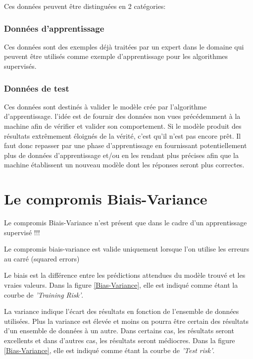 \documentclass[a4paper]{article}
\begin{document}
Ces données peuvent être distinguées en 2 catégories:

\subsubsection{Données d'apprentissage}
Ces données sont des exemples déjà traitées par un expert dans le domaine qui peuvent être utilisés comme exemple d'apprentissage pour les algorithmes supervisés.

\subsubsection{Données de test}
Ces données sont destinés à valider le modèle crée par l'algorithme d'apprentissage. l'idée est de fournir des données non vues précédemment à la machine afin de vérifier et valider son comportement. Si le modèle produit des résultats extrêmement éloignés de la vérité, c'est qu'il n'est pas encore prêt. Il faut donc repasser par une phase d'apprentissage en fournissant potentiellement plus de données d'apprentissage et/ou en les rendant plus précises afin que la machine établissent un nouveau modèle dont les réponses seront plus correctes.

\newpage

\section{Le compromis Biais-Variance}
\label{B-V}
Le compromis Biais-Variance n'est présent que dans le cadre d'un apprentissage supervisé !!!

Le compromis biais-variance est valide uniquement lorsque l'on utilise les erreurs au carré (squared errors)

Le biais est la différence entre les prédictions attendues du modèle trouvé et les vraies valeurs. Dans la figure \ref{Bias-Variance}, elle est indiqué comme étant la courbe de \textit{'Training Risk'}.\newline


La variance indique l'écart des résultats en fonction de l'ensemble de données utilisées. Plus la variance est élevée et moins on pourra être certain des résultats d'un ensemble de données à un autre. Dans certains cas, les résultats seront excellents et dans d'autres cas, les résultats seront médiocres. Dans la figure \ref{Bias-Variance}, elle est indiqué comme étant la courbe de \textit{'Test risk'}. \newline
\end{document}
